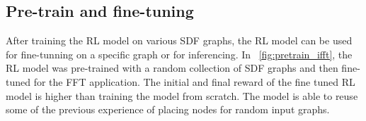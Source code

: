 \subsection{Pre-train and fine-tuning}
After training the RL model on various SDF graphs, the RL model can be used for fine-tunning on a specific graph or for inferencing.
In \figurename~\ref{fig:pretrain_ifft}, the RL model was pre-trained with a random collection of SDF graphs and then fine-tuned for the FFT application.
The initial and final reward of the fine tuned RL model is higher than training the model from scratch.
The model is able to reuse some of the previous experience of placing nodes for random input graphs.